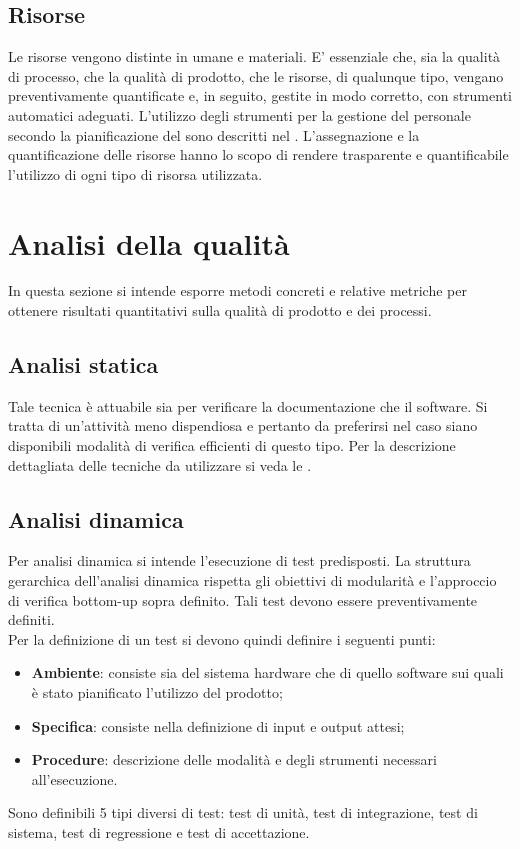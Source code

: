 \documentclass[12pt,a4paper]{article}
\begin{document}
\subsection{Risorse}
Le risorse vengono distinte in umane e materiali. E' essenziale che, sia la qualità di processo, che la qualità di prodotto, che le risorse, di qualunque tipo, vengano preventivamente quantificate e, in seguito, gestite in modo corretto, con strumenti automatici adeguati.
L'utilizzo degli strumenti per la gestione del personale secondo la pianificazione del \PdP{} sono descritti nel \NdP. L'assegnazione e la quantificazione delle risorse hanno lo scopo di rendere trasparente e quantificabile l'utilizzo di ogni tipo di risorsa utilizzata.

\newpage

\section{Analisi della qualità}\label{analisi}
In questa sezione si intende esporre metodi concreti e relative metriche per ottenere risultati quantitativi sulla qualità di prodotto e dei processi. 

\subsection{Analisi statica}
Tale tecnica è attuabile sia per verificare la documentazione che il software. Si tratta di un'attività meno dispendiosa e pertanto da preferirsi nel caso siano disponibili modalità di verifica efficienti di questo tipo. Per la descrizione dettagliata delle tecniche da utilizzare si veda le \NdP.

\subsection{Analisi dinamica}
Per analisi dinamica si intende l'esecuzione di test predisposti. La struttura gerarchica dell'analisi dinamica rispetta gli obiettivi di modularità e l'approccio di verifica bottom-up sopra definito. Tali test devono essere preventivamente definiti.\\
Per la definizione di un test si devono quindi definire i seguenti punti:
\begin{itemize}
	\item \textbf{Ambiente}: consiste sia del sistema hardware che di quello software sui quali è stato pianificato l’utilizzo del prodotto;
	\item \textbf{Specifica}: consiste nella definizione di input e output attesi;
	\item \textbf{Procedure}: descrizione delle modalità e degli strumenti necessari all'esecuzione.
\end{itemize}
Sono definibili 5 tipi diversi di test: test di unità, test di integrazione, test di sistema, test di regressione e test di accettazione.
\end{document}
